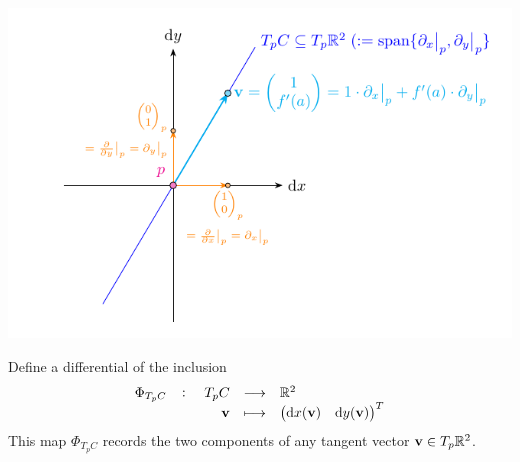 \documentclass[11pt,openany]{article}
\renewcommand{\vec}[1]{\mathbf{#1}}
\begin{document}
\begin{center}
	\includegraphics[scale=1]{tangent-space-6-3.pdf}
\end{center}
Define a differential of the inclusion \[
\fullfunction{\Phi_{T_pC}}{T_pC}{\R^2}{\vec{v}}{
\begin{pmatrix}
\mathrm{d}x(\vec{v})& 
\mathrm{d}y(\vec{v})
\end{pmatrix}^T
}
\]
This map \(\Phi_{T_pC}\) records the two components of any tangent vector \(\vec{v}\in T_p\R^2\).

\end{document}
